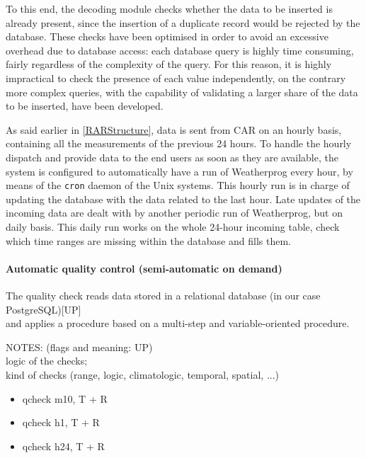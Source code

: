 \documentclass[authoryear,preprint,review,12pt]{elsarticle}
\begin{document}
 To this end, the decoding module checks whether the data to be inserted is already present, since the insertion of a duplicate record would be rejected by the database. These checks have been optimised in order to avoid an excessive overhead due to database access: each database query is highly time consuming, fairly regardless of the complexity of the query. For this reason, it is highly impractical to check the presence of each value independently, on the contrary more complex queries, with the capability of validating a larger share of the data to be inserted, have been developed.
 
As said earlier in \cref{RARStructure}, data is sent from CAR on an hourly basis,  containing all the measurements of the previous 24 hours. To handle the hourly dispatch and provide data to the end users as soon as they are available, the system is configured to automatically have a run of Weatherprog every hour, by means of the \texttt{cron} daemon of the Unix systems. This hourly run is in charge of updating the database with the data related to the last hour. Late updates of the incoming data are dealt with by another periodic run of Weatherprog, but on daily basis. This daily run works on the whole 24-hour incoming table, check which time ranges are missing within the database and fills them.

\paragraph{Automatic quality control (semi-automatic on demand)}
The quality check reads data stored in a relational database (in our case PostgreSQL)[UP]\\
and applies a procedure based on a multi-step and variable-oriented procedure.

NOTES: (flags and meaning: UP)\\
logic of the checks;\\
kind of checks (range, logic, climatologic, temporal, spatial, ...)

\begin{itemize}
    \item qcheck m10, T + R
    \item qcheck h1,  T + R
    \item qcheck h24, T + R
\end{itemize}
\end{document}
